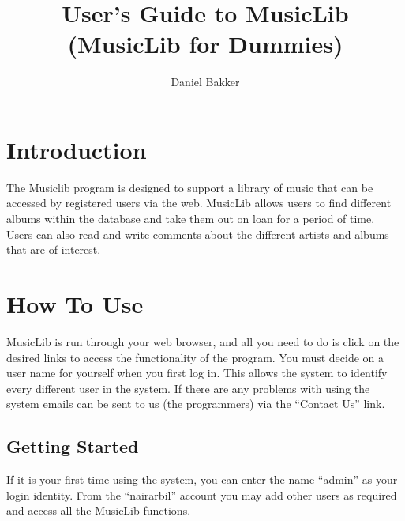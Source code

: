 \documentclass{article}
\title{User's Guide to MusicLib (MusicLib for Dummies)}
\author{Daniel Bakker}
\begin{document}
\maketitle
\tableofcontents

\section{Introduction}
The Musiclib program is designed to support a library of music that can be accessed by registered users via the web. MusicLib allows users to find different albums within the database and take them out on loan for a period of time. Users can also read and write comments about the different artists and albums that are of interest.

\section{How To Use}
MusicLib is run through your web browser, and all you need to do is click on the desired links to access the functionality of the program. You must decide on a user name for yourself when you first log in. This allows the system to identify every different user in the system. If there are any problems with using the system emails can be sent to us (the programmers) via the ``Contact Us'' link. 
\subsection{Getting Started}
If it is your first time using the system, you can enter the name ``admin'' as your login identity. From the ``nairarbil'' account you may add other users as required and access all the MusicLib functions. 
\end{document}
